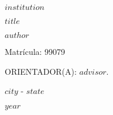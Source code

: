\thispagestyle{empty}

\begin{center}
$institution$
\end{center}


\vspace{4.0cm}

\begin{center}
    \textbf{$title$}
\end{center}

\vspace{4.0cm}

\begin{center}
$author$

Matrícula: 99079
\end{center}


\vspace{4cm}

\begin{center}

ORIENTADOR(A): $advisor$.
\end{center}

\vspace{4cm}

\begin{center}

$city$ - $state$

$year$
    
\end{center}

\newpage
\pagestyle{empty}
\renewcommand{\contentsname}{Sumário}
\tableofcontents
\newpage